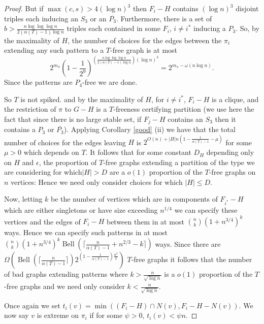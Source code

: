 \documentclass[12pt]{article}
\theoremstyle{definition}
\DeclareMathOperator{\Bell}{Bell}
\begin{document}
\begin{proof}
 But if $\max(c,s)>4(\log n)^3$ then $F_i-H$ contains $(\log n)^3$ disjoint triples each inducing an $S_3$ or an $\overline{P_3}$. Furthermore, there is a set of $b>\frac{n \log \log \log n}{2(\alpha(T)-1)\log n}$ triples each contained in some $F_i$, $i \neq i^*$ inducing a $P_3$. So, by the maximality of $H$, the number of choices for the edges between the $\pi_i$ 
 extending any such pattern to a $T$-free graph  is at most $$2^{m_\pi}\left(1-\frac{1}{2^9}\right)^{(\frac{n \log \log \log n}{2(\alpha(T)-1)\log n})(\log n)^3}=2^{m_\pi-\omega(n \log n)}.$$ Since the patterns are $P_4$-free we are done. 
 
 
 So  $T$ is not spiked. and by the maximality of $H$, for $i \neq i^*$, $F_i-H$ is a clique, and the restriction of $\pi$ to $G-H$ is a $T$-freeness 
 certifying partition (we use here the fact that since there is no large stable set, if $F_j-H$ contains an $S_3$ then it contains a
 $P_3$ or $\overline{P_3}$). Applying Corollary \ref{good} (ii) we have that the total number of choices for the edges leaving $H$ is $2^{O(n)+|H|n(1-\frac{1}{\alpha(T)-1}-\mu)}$ for some $\mu>0$ which depends on $T$. It follows that for some constant $D_H$ depending only on $H$ and $\epsilon$, the proportion of $T$-free graphs extending a partition of the type we are 
  considering for which$|H|>D$ are a $o(1)$ proportion of the $T$-free graphs on $n$ vertices: Hence we need only consider choices for which $|H| \le D$.
  
  Now,  letting $k$ be the number of vertices which are in components of $F_{i^*}-H$ which are either singletons or have size exceeding 
  $n^{1/4}$  we can specify these vertices and the edges of $F_i-H$ between them in at most ${n \choose k}(1+n^{3/4})^k$ 
  ways. Hence we can specify such  patterns in at most  ${n \choose k}(1+n^{3/4})^k\Bell(\lceil \frac{n}{\alpha(T)-1}+n^{2/3}-k\rceil)$ ways. Since there are $\Omega(\Bell(\lceil \frac{n}{\alpha(T)-1} \rceil)2^{(1-\frac{1}{\alpha(T)-1})\frac{n^2}{2}})$ $T$-free graphs it follows that the number of bad graphs extending patterns where $k>\frac{n}{\sqrt{\log n}}$ is a $o(1)$ proportion of the $T$-free graphs and 
  we need only consider $k<\frac{n}{\sqrt{\log n}}$. 
 
Once again we set $t_i(v)=\min((F_i-H) \cap N(v), F_i-H-N(v))$. We now  say $v$ is extreme on $\pi_i$ if for some $\psi>0$,  $t_i(v)< \psi n$. 


\end{proof}
\end{document}
